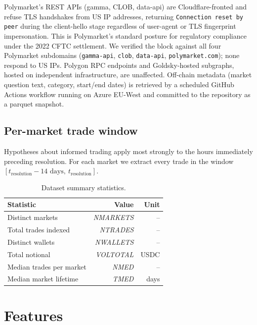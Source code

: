 \documentclass[11pt]{article}
\begin{document}
Polymarket's REST APIs (gamma, CLOB, data-api) are Cloudflare-fronted
and refuse TLS handshakes from US IP addresses, returning
\texttt{Connection reset by peer} during the client-hello stage
regardless of user-agent or TLS fingerprint impersonation. This is
Polymarket's standard posture for regulatory compliance under the
2022 CFTC settlement. We verified the block against all four
Polymarket subdomains (\texttt{gamma-api}, \texttt{clob},
\texttt{data-api}, \texttt{polymarket.com}); none respond to US IPs.
Polygon RPC endpoints and Goldsky-hosted subgraphs, hosted on
independent infrastructure, are unaffected. Off-chain metadata
(market question text, category, start/end dates) is retrieved by a
scheduled GitHub Actions workflow running on Azure EU-West and
committed to the repository as a parquet snapshot.

\subsection{Per-market trade window}

Hypotheses about informed trading apply most strongly to the hours
immediately preceding resolution. For each market we extract every trade
in the window $[t_{\text{resolution}} - 14\text{ days},\ t_{\text{resolution}}]$.

\begin{table}[t]
  \centering
  \caption{Dataset summary statistics.}
  \label{tab:data_summary}
  \begin{tabular}{lrr}
    \toprule
    Statistic & Value & Unit \\
    \midrule
    Distinct markets & \textit{NMARKETS} & -- \\
    Total trades indexed & \textit{NTRADES} & -- \\
    Distinct wallets & \textit{NWALLETS} & -- \\
    Total notional & \textit{VOLTOTAL} & USDC \\
    Median trades per market & \textit{NMED} & -- \\
    Median market lifetime & \textit{TMED} & days \\
    \bottomrule
  \end{tabular}
\end{table}

\section{Features}
\label{sec:features}
\end{document}
